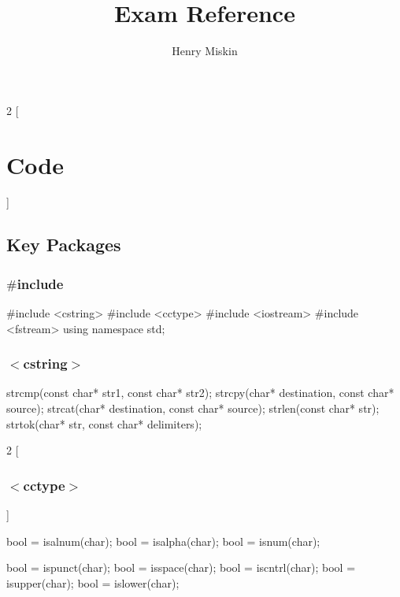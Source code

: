 \documentclass[10pt,a4paper]{extarticle}
\begin{document}
\title{Exam Reference}
\author{Henry Miskin}

\fancyhf{}
\renewcommand{\headrulewidth}{0pt}
\cfoot{\thepage}
\rfoot{\today}



\begin{multicols}{2}
[\section*{Code}]
\subsection*{Key Packages}

\subsubsection*{$\#$include}
\begin{cppcode}
  #include <cstring>
  #include <cctype>
  #include <iostream>
  #include <fstream>
  using namespace std;  
\end{cppcode}

\subsubsection*{$<$cstring$>$}
\begin{cppcode}
  strcmp(const char* str1, const char* str2);
  strcpy(char* destination, const char* source);
  strcat(char* destination, const char* source);
  strlen(const char* str);
  strtok(char* str, const char* delimiters);
\end{cppcode}

\begin{multicols}{2}
[\subsubsection*{$<$cctype$>$}]
\begin{cppcode}
  bool = isalnum(char);
  bool = isalpha(char);
  bool = isnum(char);

  bool = ispunct(char);
  bool = isspace(char);
  bool = iscntrl(char);
  bool = isupper(char);
  bool = islower(char);


\end{cppcode}
\end{multicols}
\end{multicols}
\end{document}
